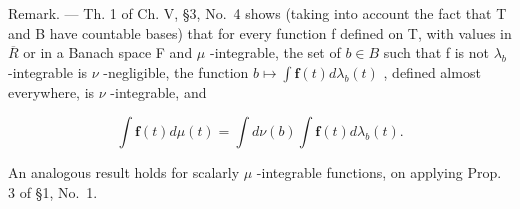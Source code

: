Remark. --- Th. 1 of Ch. V, §3, No.~4 shows (taking into account the fact that T and B have countable bases) that for every function f defined on T, with values in \(\overline{R}\) or in a Banach space F and \(\mu\) -integrable, the set of \(b \in B\) such that f is not \(\lambda_{b}\) -integrable is \(\nu\) -negligible, the function \(b \mapsto \int \mathbf{f}(t) d\lambda_{b}(t)\) , defined almost everywhere, is \(\nu\) -integrable, and

\[
\int \mathbf {f} (t) d \mu (t) = \int d \nu (b) \int \mathbf {f} (t) d \lambda_ {b} (t).
\]

An analogous result holds for scalarly \(\mu\) -integrable functions, on applying Prop. 3 of §1, No.~1.

